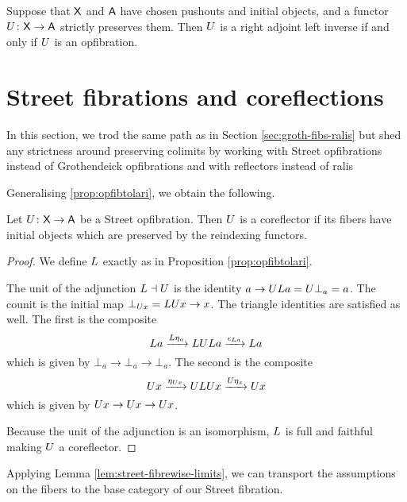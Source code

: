 \documentclass{amsart}
\begin{document}
\begin{thm}\label{thm:mainthm}
Suppose that $\mathsf{X}$ and $\mathsf{A}$ have chosen pushouts and initial objects, and a functor $U\colon\mathsf{X}\to\mathsf{A}$ strictly preserves them. Then $U$ is a right adjoint left inverse if and only if $U$ is an opfibration.
\end{thm}


\section{Street fibrations and coreflections}\label{Streetfibs}

In this section, we trod the same path as in Section
\ref{sec:groth-fibs-ralis} but shed any strictness around
preserving colimits by working with Street opfibrations
instead of Grothendeick opfibrations and with reflectors instead of ralis

Generalising \cref{prop:opfibtolari}, we obtain
the following. 

\begin{prop}
  \label{thm:street-opfib-to-corefl}
  Let $ U \colon \mathsf{X} \to \mathsf{A} $ be a Street
  opfibration. Then $ U $ is a coreflector if its
  fibers have initial objects which are preserved
  by the reindexing functors.
\end{prop}

\begin{proof}
  We define $ L $ exactly as in Proposition
  \ref{prop:opfibtolari}. 

  The unit of the adjunction $ L \dashv U $ is the
  identity $ a\to UL a = U\bot_a = a $.  The
  counit is the initial map $ \bot_{U x} = LU x \to
  x $.  The triangle identities are satisfied as
  well. The first is the composite
  \[
    L a
    \xrightarrow{L\eta_a}        LUL a
    \xrightarrow{\epsilon_{L a}} L a
  \]
  which is given by $ \bot_a \to \bot_a \to \bot_a
  $.  The second is the composite
  \[
    U x
    \xrightarrow{\eta_{U x}} ULU x
    \xrightarrow{U\eta_x}    U x
  \]
  which is given by $ U x \to U x \to U x $.

  Because the unit of the adjunction is an
  isomorphism, $ L $ is full and faithful
  \cite[{Prop.~1.3}]{gabrielzisman} making $ U $ a
  coreflector.
\end{proof}

Applying Lemma \ref{lem:street-fibrewise-limits}, we can
transport the assumptions on the fibers to the base category
of our Street fibration.
\end{document}
